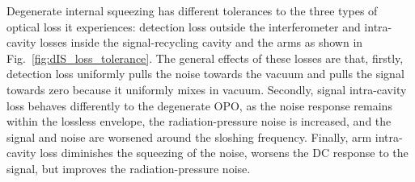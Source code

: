 
Degenerate internal squeezing has different tolerances to the three types of optical loss it experiences: detection loss outside the interferometer and intra-cavity losses inside the signal-recycling cavity and the arms as shown in Fig.~\ref{fig:dIS_loss_tolerance}. %
The general effects of these losses are that, firstly, detection loss uniformly pulls the noise towards the vacuum and pulls the signal towards zero because it uniformly mixes in vacuum. Secondly, signal intra-cavity loss behaves differently to the degenerate OPO, as the noise response remains within the lossless envelope, the radiation-pressure noise is increased, and the signal and noise are worsened around the sloshing frequency. Finally, arm intra-cavity loss diminishes the squeezing of the noise, worsens the DC response to the signal, but improves the radiation-pressure noise.

